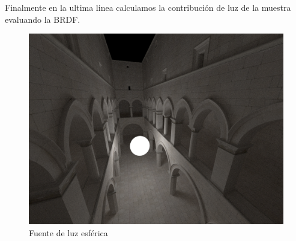 \medskip

Finalmente en la ultima linea calculamos la contribución de luz de la muestra evaluando la BRDF.


\begin{figure}
\centering
\includegraphics[width=5in]{esferica.png}
\caption{Fuente de luz esférica}
\end{figure}

